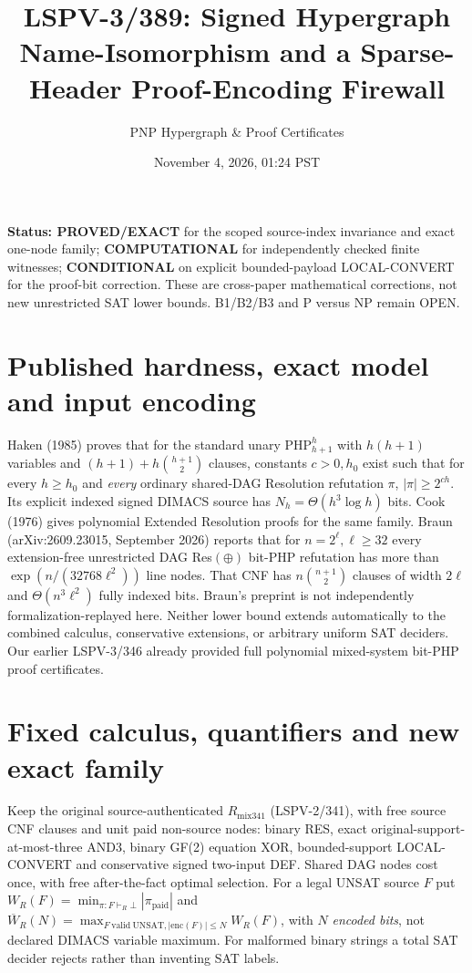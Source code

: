 \documentclass[11pt]{article}
\title{LSPV-3/389: Signed Hypergraph Name-Isomorphism and a Sparse-Header Proof-Encoding Firewall}
\author{PNP Hypergraph \& Proof Certificates}
\date{November 4, 2026, 01:24 PST}
\begin{document}
\maketitle
\noindent\textbf{Status: PROVED/EXACT} for the scoped source-index invariance and exact one-node family; \textbf{COMPUTATIONAL} for independently checked finite witnesses; \textbf{CONDITIONAL} on explicit bounded-payload LOCAL-CONVERT for the proof-bit correction. These are cross-paper mathematical corrections, not new unrestricted SAT lower bounds. B1/B2/B3 and P versus NP remain OPEN.

\section*{Published hardness, exact model and input encoding}
Haken (1985) proves that for the standard unary $\mathrm{PHP}_{h+1}^h$ with $h(h+1)$ variables and $(h+1)+h\binom{h+1}{2}$ clauses, constants $c>0,h_0$ exist such that for every $h\ge h_0$ and \emph{every} ordinary shared-DAG Resolution refutation $\pi$, $|\pi|\ge 2^{ch}$. Its explicit indexed signed DIMACS source has $N_h=\Theta(h^3\log h)$ bits. Cook (1976) gives polynomial Extended Resolution proofs for the same family. Braun (arXiv:2609.23015, September 2026) reports that for $n=2^\ell,\ell\ge32$ every extension-free unrestricted DAG Res$(\oplus)$ bit-PHP refutation has more than $\exp(n/(32768\ell^2))$ line nodes. That CNF has $n\binom{n+1}{2}$ clauses of width $2\ell$ and $\Theta(n^3\ell^2)$ fully indexed bits. Braun's preprint is not independently formalization-replayed here. Neither lower bound extends automatically to the combined calculus, conservative extensions, or arbitrary uniform SAT deciders. Our earlier LSPV-3/346 already provided full polynomial mixed-system bit-PHP proof certificates.

\section*{Fixed calculus, quantifiers and new exact family}
Keep the original source-authenticated $R_{\mathrm{mix341}}$ (LSPV-2/341), with free source CNF clauses and unit paid non-source nodes: binary RES, exact original-support-at-most-three AND3, binary GF(2) equation XOR, bounded-support LOCAL-CONVERT and conservative signed two-input DEF. Shared DAG nodes cost once, with free after-the-fact optimal selection. For a legal UNSAT source $F$ put $W_R(F)=\min_{\pi:F\vdash_R\bot}|\pi_{\mathrm{paid}}|$ and $\overline W_R(N)=\max_{F\mathrm{\ valid\ UNSAT},|\mathrm{enc}(F)|\le N}W_R(F)$, with $N$ \emph{encoded bits}, not declared DIMACS variable maximum. For malformed binary strings a total SAT decider rejects rather than inventing SAT labels.
\end{document}
